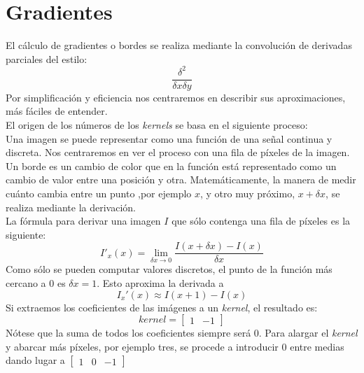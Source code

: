 \section{Gradientes}
El cálculo de gradientes o bordes \emph{\citep*[11. Feature
  Detectors]{fisher1996hypermedia}} \emph{\citep*[Gradients and Sobel
  Derivatives]{opencv_book-bib}} \emph{\citep*[5.1 Edge
  Tracking]{toennies2012guide}} se realiza mediante la convolución de
derivadas parciales del estilo:
\begin{equation*}
  \frac{\delta^{2}}{\delta x \delta y}
\end{equation*}
Por simplificación y eficiencia nos centraremos en describir sus
aproximaciones, más fáciles de entender. \\
El origen de los números de los \emph{kernels} se basa en el siguiente
proceso:\\
Una imagen se puede representar como una función de una señal continua
y discreta. Nos centraremos en ver el proceso con una fila de píxeles
de la imagen. Un borde es un cambio de color que en la función está
representado como un cambio de valor entre una posición y
otra. Matemáticamente, la manera de medir cuánto cambia entre un punto
,por ejemplo $x$, y otro muy próximo, $x + \delta x$, se realiza
mediante la
derivación.\\
La fórmula para derivar una imagen $I$ que sólo contenga una fila de
píxeles es la siguiente:
\begin{equation*}
  I'_x(x) = \lim_{\delta x \to 0}\frac{I(x+\delta x) - I(x)}{\delta x}
\end{equation*}
Como sólo se pueden computar valores discretos, el punto de la función
más cercano a $0$ es $\delta x = 1$. Esto aproxima la derivada a
\begin{equation*}
  I_x'(x) \approx I(x + 1) - I(x)
\end{equation*}
Si extraemos los coeficientes de las imágenes a un \emph{kernel}, el
resultado es:
\begin{equation*}
  kernel = \begin{bmatrix}
    1 & -1
  \end{bmatrix}
\end{equation*}
Nótese que la suma de todos los coeficientes siempre será $0$. Para
alargar el \emph{kernel} y abarcar más píxeles, por ejemplo tres, se
procede a introducir $0$ entre medias dando lugar a
$\begin{bmatrix} 1 & 0 & -1 \end{bmatrix}$ \\
